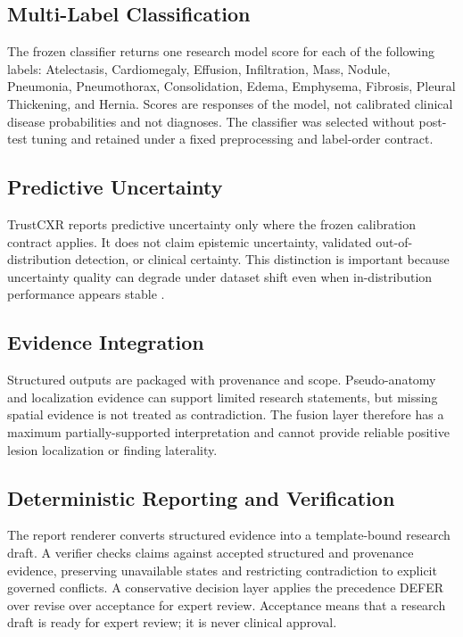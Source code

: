 \documentclass[10pt,a4paper,twocolumn]{article}
\begin{document}
\subsection{Multi-Label Classification}
The frozen classifier returns one research model score for each of the following labels: Atelectasis, Cardiomegaly, Effusion, Infiltration, Mass, Nodule, Pneumonia, Pneumothorax, Consolidation, Edema, Emphysema, Fibrosis, Pleural Thickening, and Hernia. Scores are responses of the model, not calibrated clinical disease probabilities and not diagnoses. The classifier was selected without post-test tuning and retained under a fixed preprocessing and label-order contract.

\subsection{Predictive Uncertainty}
TrustCXR reports predictive uncertainty only where the frozen calibration contract applies. It does not claim epistemic uncertainty, validated out-of-distribution detection, or clinical certainty. This distinction is important because uncertainty quality can degrade under dataset shift even when in-distribution performance appears stable \citep{ovadia2019uncertainty}.

\subsection{Evidence Integration}
Structured outputs are packaged with provenance and scope. Pseudo-anatomy and localization evidence can support limited research statements, but missing spatial evidence is not treated as contradiction. The fusion layer therefore has a maximum partially-supported interpretation and cannot provide reliable positive lesion localization or finding laterality.

\subsection{Deterministic Reporting and Verification}
The report renderer converts structured evidence into a template-bound research draft. A verifier checks claims against accepted structured and provenance evidence, preserving unavailable states and restricting contradiction to explicit governed conflicts. A conservative decision layer applies the precedence DEFER over revise over acceptance for expert review. Acceptance means that a research draft is ready for expert review; it is never clinical approval.
\end{document}
